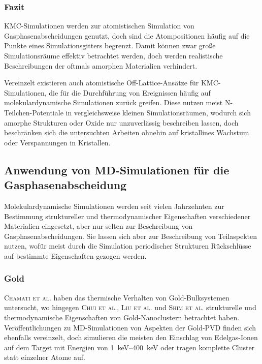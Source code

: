\subsubsection{Fazit}

KMC-Simulationen werden zur atomistischen Simulation von Gasphasenabscheidungen genutzt, doch sind die Atompositionen häufig auf die Punkte eines Simulationsgitters begrenzt.
Damit können zwar große Simulationsräume effektiv betrachtet werden, doch werden realistische Beschreibungen der oftmals amorphen Materialien verhindert.

Vereinzelt existieren auch atomistische Off-Lattice-Ansätze für KMC-Simulationen, die für die Durchführung von Ereignissen häufig auf molekulardynamische Simulationen zurück greifen.
Diese nutzen meist N-Teilchen-Potentiale in vergleichsweise kleinen Simulationsräumen, wodurch sich amorphe Strukturen oder Oxide nur unzuverlässig beschreiben lassen, doch beschränken sich die untersuchten Arbeiten ohnehin auf kristallines Wachstum oder Verspannungen in Kristallen.

\subsection{Anwendung von MD-Simulationen für die Gasphasenabscheidung}

Molekulardynamische Simulationen werden seit vielen Jahrzehnten zur Bestimmung struktureller und thermodynamischer Eigenschaften verschiedener Materialien eingesetzt, aber nur selten zur Beschreibung von Gasphasenabscheidungen.
Sie lassen sich aber zur Beschreibung von Teilaspekten nutzen, wofür meist durch die Simulation periodischer Strukturen Rückschlüsse auf bestimmte Eigenschaften gezogen werden.

\subsubsection{Gold}
\textsc{Chamati et al.}\cite{chamati_second-moment_2004} haben das thermische Verhalten von Gold-Bulksystemen untersucht, wo hingegen \textsc{Chui et al.}\cite{chui_molecular_2007}, \textsc{Liu et al.}\cite{liu_melting_2001} und \textsc{Shim et al.}\cite{shim_molecular_2003} strukturelle und thermodynamische Eigenschaften von Gold-Nanoclustern betrachtet haben.
Veröffentlichungen zu MD-Simulationen von Aspekten der Gold-PVD finden sich ebenfalls vereinzelt, doch simulieren die meisten den Einschlag von Edelgas-Ionen auf dem Target mit Energien von \SIrange{1}{400}{\kilo\electronvolt}\cite{insepov_molecular_1995,shapiro_simulation_1999} oder tragen komplette Cluster statt einzelner Atome auf\cite{inoue_molecular_2008}.

